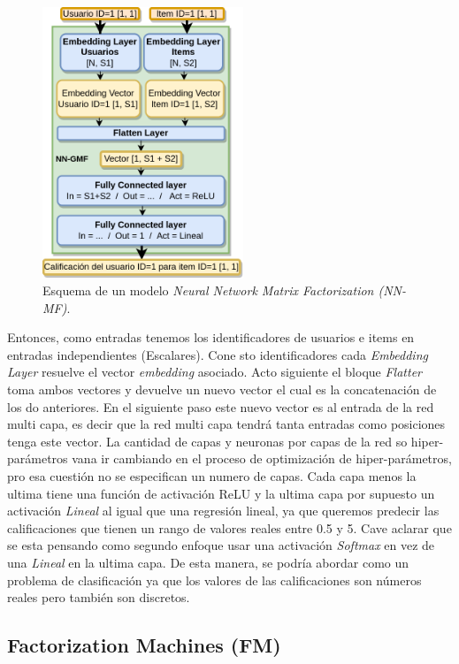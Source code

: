 \documentclass[11pt,a4paper,twoside]{thesis}
\begin{document}
\begin{figure}[h!]
	\centering
	\includegraphics[width=6cm]{./images/NN-MF.png}

	\caption{
		Esquema de un modelo \textit{Neural Network Matrix Factorization (NN-MF)}.
	}
	\label{fig:NNMFModel}
\end{figure}


Entonces, como entradas tenemos los identificadores de usuarios e items en entradas independientes (Escalares). Cone sto identificadores cada \textit{Embedding Layer} resuelve el vector \textit{embedding} asociado. Acto siguiente el bloque \textit{Flatter} toma ambos vectores y devuelve un nuevo vector el cual es la concatenación de los do anteriores. En el siguiente paso este nuevo vector es al entrada de la red multi capa, es decir que la red multi capa tendrá tanta entradas como posiciones tenga este vector. La cantidad de capas y neuronas por capas de la red so hiper-parámetros vana  ir cambiando en el proceso de optimización de hiper-parámetros, pro esa cuestión no se especifican un numero de capas. Cada capa menos la ultima tiene una función de activación ReLU y la ultima capa por supuesto un activación \textit{Lineal} al igual que una regresión lineal, ya que queremos predecir las calificaciones que tienen un rango de valores reales entre 0.5 y 5. Cave aclarar que se esta pensando como segundo enfoque usar una activación \textit{Softmax} en vez de una \textit{Lineal} en la ultima capa. De esta manera, se podría abordar como un problema de clasificación ya que los valores de las calificaciones son números reales pero también son discretos.


\clearpage

\subsection{Factorization Machines (FM)}
\end{document}

